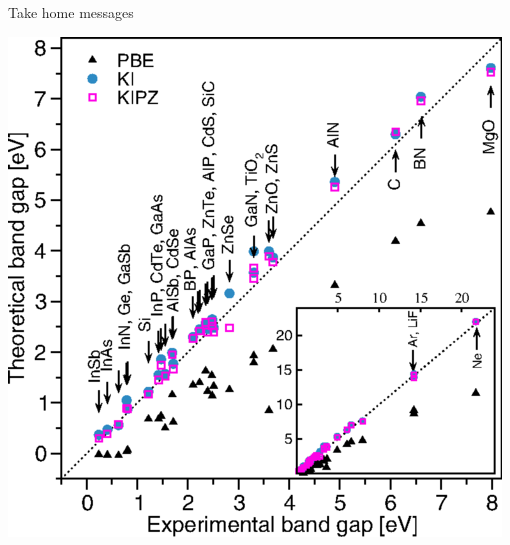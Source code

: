\documentclass[xcolor=table,aspectratio=169]{beamer}
\numberwithin{equation}{section}
\begin{document}
\begin{frame}{Take home messages}

   \includegraphics[height=0.25\paperheight]{figures/fig_nguyen_prx_bandgaps.png}
   \hfill

\end{frame}
\end{document}
